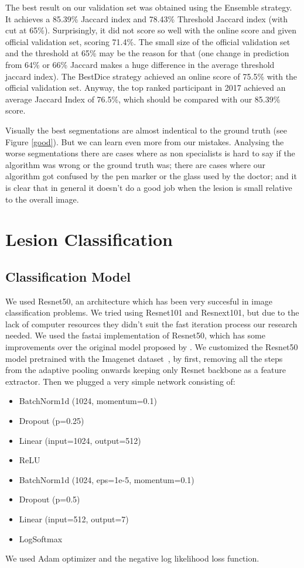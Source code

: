 \documentclass[conference]{IEEEtran}
\begin{document}
The best result on our validation set was obtained using the Ensemble strategy.  It achieves a 85.39\% Jaccard index and 78.43\% Threshold Jaccard index (with cut at 65\%). Surprisingly, it did not score so well with the online score and given official validation set, scoring 71.4\%.  The small size of the official validation set and the threshold at 65\% may be the reason for that (one change in prediction from 64\% or 66\% Jaccard makes a huge difference in the average threshold jaccard index). The BestDice strategy achieved an online score of 75.5\% with the official validation set.   Anyway, the top ranked participant in 2017 achieved an average Jaccard Index of 76.5\%, which should be compared with our 85.39\% score.

Visually the best segmentations are almost indentical to the ground truth (see Figure \ref{good}). But we can learn even more from our mistakes. Analysing the worse segmentations there are cases where as non specialists is hard to say if the algorithm was wrong or the ground truth was; there are cases where our algorithm got confused by the pen marker or the glass used by the doctor; and it is clear that in general it doesn't do a good job when the lesion is small relative to the overall image. 

\section{Lesion Classification}
\label{classification}

\subsection{Classification Model}
We used Resnet50, an architecture which has been very succesful in image classification problems. We tried using Resnet101 and Resnext101, but due to the lack of computer resources they didn't suit the fast iteration process our research needed. We used the fastai implementation of Resnet50, which has some improvements over the original model proposed by \cite{resnet}. We customized the Resnet50 model pretrained with the Imagenet dataset~\cite{imagenet}, by first, removing all the steps from the adaptive pooling onwards keeping only Resnet backbone as a feature extractor. Then we plugged a very simple network consisting of:
\begin{itemize}
\item BatchNorm1d (1024, momentum=0.1)
\item Dropout (p=0.25)
\item Linear (input=1024, output=512)
\item ReLU 
\item BatchNorm1d (1024, eps=1e-5, momentum=0.1)
\item Dropout (p=0.5)
\item Linear (input=512, output=7)
\item LogSoftmax
\end{itemize}
We used Adam optimizer and the negative log likelihood loss function.
\end{document}
